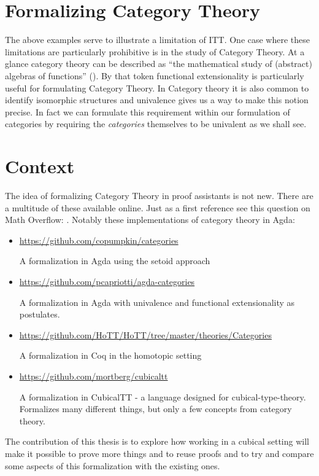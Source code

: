 \section{Formalizing Category Theory}
%
The above examples serve to illustrate a limitation of ITT. One case where these
limitations are particularly prohibitive is in the study of Category Theory. At
a glance category theory can be described as ``the mathematical study of
(abstract) algebras of functions'' (\cite{awodey-2006}). By that token
functional extensionality is particularly useful for formulating Category
Theory. In Category theory it is also common to identify isomorphic structures
and univalence gives us a way to make this notion precise. In fact we can
formulate this requirement within our formulation of categories by requiring the
\emph{categories} themselves to be univalent as we shall see.

\section{Context}
\label{sec:context}
%
The idea of formalizing Category Theory in proof assistants is not new. There
are a multitude of these available online. Just as a first reference see this
question on Math Overflow: \cite{mo-formalizations}. Notably these
implementations of category theory in Agda:
%
\begin{itemize}
\item
  \url{https://github.com/copumpkin/categories}

  A formalization in Agda using the setoid approach
\item
  \url{https://github.com/pcapriotti/agda-categories}

  A formalization in Agda with univalence and functional extensionality as
  postulates.
\item
  \url{https://github.com/HoTT/HoTT/tree/master/theories/Categories}

  A formalization in Coq in the homotopic setting
\item
  \url{https://github.com/mortberg/cubicaltt}

  A formalization in CubicalTT - a language designed for cubical-type-theory.
  Formalizes many different things, but only a few concepts from category
  theory.

\end{itemize}
%
The contribution of this thesis is to explore how working in a cubical setting
will make it possible to prove more things and to reuse proofs and to try and
compare some aspects of this formalization with the existing ones.

